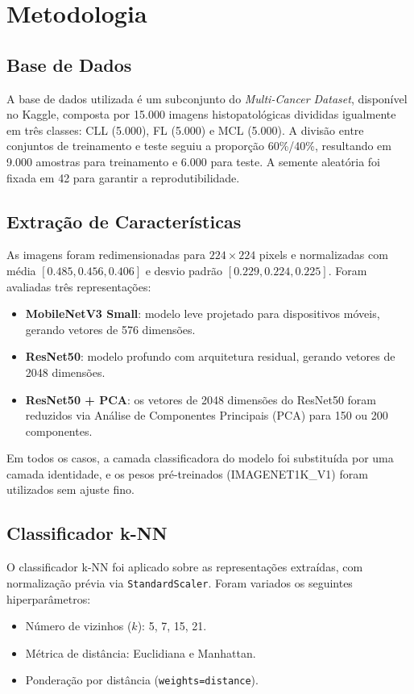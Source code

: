 \documentclass[10pt,twocolumn,letterpaper]{article}
\begin{document}
\section{Metodologia}
\label{sec:metodologia}

\subsection{Base de Dados}

A base de dados utilizada é um subconjunto do \textit{Multi-Cancer Dataset}, disponível no Kaggle, composta por 15.000 imagens histopatológicas divididas igualmente em três classes: CLL (5.000), FL (5.000) e MCL (5.000). A divisão entre conjuntos de treinamento e teste seguiu a proporção 60\%/40\%, resultando em 9.000 amostras para treinamento e 6.000 para teste. A semente aleatória foi fixada em 42 para garantir a reprodutibilidade.

\subsection{Extração de Características}

As imagens foram redimensionadas para $224 \times 224$ pixels e normalizadas com média $[0.485, 0.456, 0.406]$ e desvio padrão $[0.229, 0.224, 0.225]$. Foram avaliadas três representações:

\begin{itemize}
  \item \textbf{MobileNetV3 Small}: modelo leve projetado para dispositivos móveis, gerando vetores de 576 dimensões.
  \item \textbf{ResNet50}: modelo profundo com arquitetura residual, gerando vetores de 2048 dimensões.
  \item \textbf{ResNet50 + PCA}: os vetores de 2048 dimensões do ResNet50 foram reduzidos via Análise de Componentes Principais (PCA) para 150 ou 200 componentes.
\end{itemize}

Em todos os casos, a camada classificadora do modelo foi substituída por uma camada identidade, e os pesos pré-treinados (IMAGENET1K\_V1) foram utilizados sem ajuste fino.

\subsection{Classificador k-NN}

O classificador k-NN foi aplicado sobre as representações extraídas, com normalização prévia via \texttt{StandardScaler}. Foram variados os seguintes hiperparâmetros:
\begin{itemize}
  \item Número de vizinhos ($k$): 5, 7, 15, 21.
  \item Métrica de distância: Euclidiana e Manhattan.
  \item Ponderação por distância (\texttt{weights=distance}).
\end{itemize}
\end{document}
